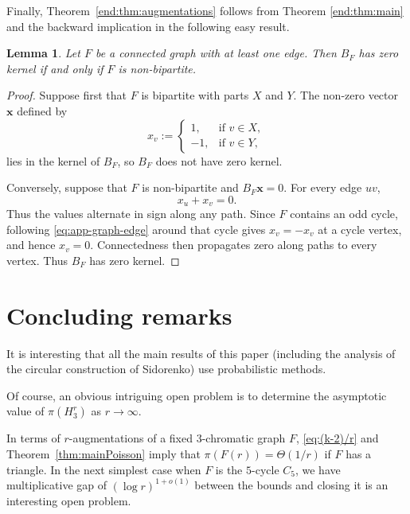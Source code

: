 \documentclass[10pt,a4paper]{article}
\numberwithin{equation}{section}
\newtheorem{lemma}[theorem]{Lemma}
\theoremstyle{definition}
\theoremstyle{remark}
\newcommand{\V}[1]{\boldsymbol{#1}}
\begin{document}
Finally,  Theorem~\ref{end:thm:augmentations}
follows from Theorem \ref{end:thm:main} and the backward implication in the following easy result.




\begin{lemma}\label{lem:app-graph-rank}
Let $F$ be a connected graph with at least one edge.  Then $B_F$ has zero kernel if and only if $F$ is non-bipartite.
\end{lemma}

\begin{proof}
Suppose first that $F$ is bipartite with parts $X$ and $Y$.  The non-zero vector $\V{x}$ defined by
\[
 x_v:=\left\{\begin{array}{rl}
 	 1,&\text{if $v\in X$},\\
-1,&\text{if $v\in Y$,}
\end{array}\right.
\]
lies in the kernel of $B_F$, so $B_F$ does not have zero kernel.

Conversely, suppose that $F$ is non-bipartite and $B_F\V{x}=0$.  For every edge $uv$,
\begin{equation}\label{eq:app-graph-edge}
 x_u+x_v=0.
\end{equation}
Thus the values alternate in sign along any path.  Since $F$ contains an odd cycle, following \eqref{eq:app-graph-edge} around that cycle gives $x_v=-x_v$ at a cycle vertex, and hence $x_v=0$.  Connectedness then propagates zero along paths to every vertex.  Thus $B_F$ has zero kernel.
\end{proof}

\section{Concluding remarks}
\label{sec:concluding}


It is interesting that all the main results of this paper (including the analysis of the circular construction of Sidorenko) use probabilistic methods.

Of course, an obvious intriguing open problem is to determine the asymptotic value of $\pi(H_3^r)$ as $r\to\infty$.

In terms of $r$-augmentations of a fixed $3$-chromatic graph $F$, \eqref{eq:(k-2)/r} and Theorem~\ref{thm:mainPoisson} imply that $\pi(F(r))=\Theta(1/r)$ if $F$ has a triangle. In the next simplest case when $F$ is the $5$-cycle $C_5$, we have multiplicative gap of $(\log r)^{1+o(1)}$ between the bounds and closing it is an interesting open problem.
\end{document}

